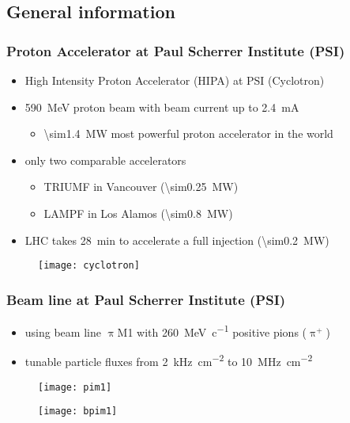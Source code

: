 \subsection{General information}
\begin{frame}
	\frametitle{Proton Accelerator at Paul Scherrer Institute (PSI)}
	\begin{itemize}
		\setlength{\itemsep}{\fill}
		\item High Intensity Proton Accelerator (HIPA) at PSI (Cyclotron)
		\item \SI{590}{\mega\electronvolt} proton beam with beam current up to \SI{2.4}{\milli\ampere}
		\begin{itemize}
			\vspace*{4pt}
			\item \SI{\sim1.4}{\mega\watt} \ra most powerful proton accelerator in the world
		\end{itemize}
		\vspace*{4pt}
		\item only two comparable accelerators
		\begin{itemize}
			\vspace*{4pt}
			\item TRIUMF in Vancouver (\SI{\sim0.25}{\mega\watt})
			\item LAMPF in Los Alamos (\SI{\sim0.8}{\mega\watt})
		\end{itemize}
		\item LHC takes \SI{28}{\minute} to accelerate a full injection (\SI{\sim0.2}{\mega\watt})
	\end{itemize}
	\begin{figure}
		\centering
		\texttt{[image: cyclotron]}
	\end{figure}
\end{frame}
\begin{frame}
	\frametitle{Beam line at Paul Scherrer Institute (PSI)}
	\begin{minipage}[c][.75\textheight]{6.5cm}
		\begin{itemize}
			\setlength{\itemsep}{\fill}
			\item using beam line $\uppi$M1 with \SI{260}{\mega\electronvolt\per c} positive pions ($\uppi^+$)
			\item tunable particle fluxes from \SI{2}{\kilo\hertz\per cm^2} to \SI{10}{\mega\hertz\per cm^2}
		\end{itemize}
		\begin{figure}
			\centering
			\texttt{[image: pim1]}
		\end{figure}
	\end{minipage}
	\begin{minipage}{4.5cm}
		\begin{figure}
			\centering
			\texttt{[image: bpim1]}
		\end{figure}
	\end{minipage}
\end{frame}
